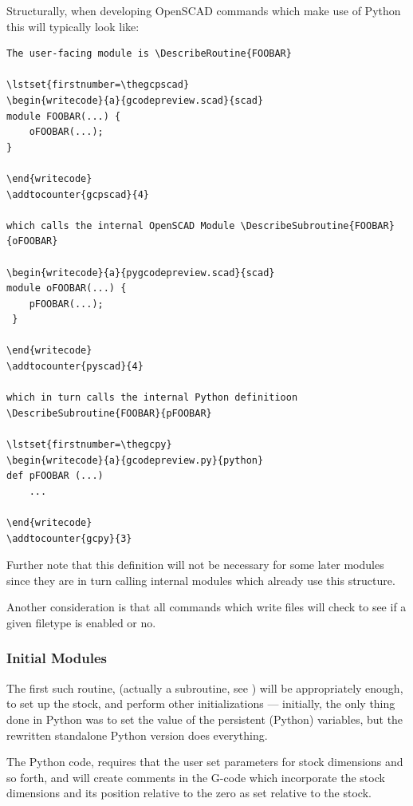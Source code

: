 \documentclass{ltxdoc}
\begin{document}
Structurally, when developing OpenSCAD commands which make use of Python this will typically look like:

\begin{verbatim}
The user-facing module is \DescribeRoutine{FOOBAR}

\lstset{firstnumber=\thegcpscad}
\begin{writecode}{a}{gcodepreview.scad}{scad}
module FOOBAR(...) {
    oFOOBAR(...);
}

\end{writecode}
\addtocounter{gcpscad}{4}
 
which calls the internal OpenSCAD Module \DescribeSubroutine{FOOBAR}{oFOOBAR}

\begin{writecode}{a}{pygcodepreview.scad}{scad}
module oFOOBAR(...) {
    pFOOBAR(...);
 }
 
\end{writecode}
\addtocounter{pyscad}{4}

which in turn calls the internal Python definitioon \DescribeSubroutine{FOOBAR}{pFOOBAR}

\lstset{firstnumber=\thegcpy}
\begin{writecode}{a}{gcodepreview.py}{python}
def pFOOBAR (...)
    ...
    
\end{writecode}
\addtocounter{gcpy}{3}
\end{verbatim}

Further note that this definition will not be necessary for some later modules since they are in turn calling internal modules which already use this structure.

Another consideration is that all commands which write files will check to see if a given filetype is enabled or no.

\subsubsection{Initial Modules}

The first such routine, (actually a subroutine, see )  will be appropriately enough, to set up the stock, and perform other initializations --- initially, the only thing done in Python was to set the value of the persistent (Python) variables, but the rewritten standalone Python version does everything.

The Python code,  requires that the user set parameters for stock dimensions and so forth, and will create comments in the G-code which incorporate the stock dimensions and its position relative to the zero as set relative to the stock.
 
\end{document}
